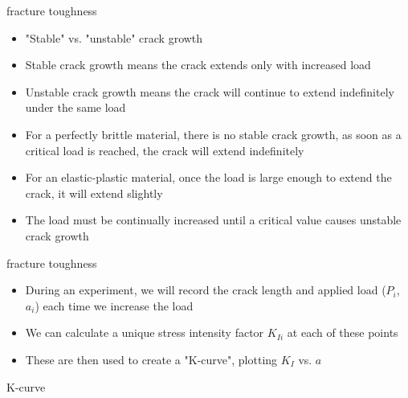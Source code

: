 \documentclass[10pt]{beamer}
\begin{document}
\begin{frame}{fracture toughness}
	\begin{itemize}[<+->]
		\item "Stable" vs. "unstable" crack growth
		\item Stable crack growth means the crack extends only with increased load
		\item Unstable crack growth means the crack will continue to extend indefinitely under the same load
		\item For a perfectly brittle material, there is no stable crack growth, as soon as a critical load is reached, the crack will extend indefinitely
		\item For an elastic-plastic material, once the load is large enough to extend the crack, it will extend slightly
		\item The load must be continually increased until a critical value causes unstable crack growth
	\end{itemize}
\end{frame}

\begin{frame}{fracture toughness}
	\begin{itemize}[<+->]
		\item During an experiment, we will record the crack length and applied load ($P_i$, $a_i$) each time we increase the load
		\item We can calculate a unique stress intensity factor $K_{Ii}$ at each of these points
		\item These are then used to create a "K-curve", plotting $K_I$ vs. $a$
	\end{itemize}
\end{frame}

\begin{frame}{K-curve}
	\begin{figure}
	\end{figure}
\end{frame}
\end{document}
